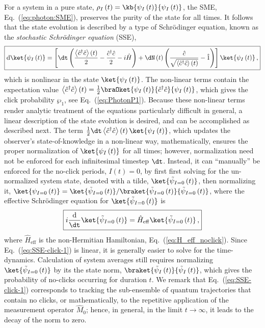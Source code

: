 For a system in a pure state, $\rho_{I}\left(t\right)=\kb{\psi_{I}\left(t\right)}{\psi_{I}\left(t\right)}$,
the SME, Eq.~(\ref{eq:photon:SME}), preserves the purity of the
state for all times. It follows that the state evolution is described
by a type of Schrödinger equation, known as the \emph{stochastic Schrödinger
equation }(SSE), 
\begin{equation}
\boxed{\mathrm{d}\ket{\psi_{I}\left(t\right)}=\left[\dt\left(\frac{\left\langle \hat{c}^{\dagger}\hat{c}\right\rangle \left(t\right)}{2}-\frac{\hat{c}^{\dagger}\hat{c}}{2}-i\hat{H}\right)+\dN\left(t\right)\left(\frac{\hat{c}}{\sqrt{\left\langle \hat{c}^{\dagger}\hat{c}\right\rangle \left(t\right)}}-\hat{1}\right)\right]\ket{\psi_{I}\left(t\right)}\,,}\label{eq:SSE-click}
\end{equation}
which is nonlinear in the state $\ket{\psi_{I}\left(t\right)}$. The
non-linear terms contain the expectation value $\left\langle \hat{c}^{\dagger}\hat{c}\right\rangle \left(t\right)=\frac{1}{2}\braOket{\psi_{I}\left(t\right)}{\hat{c}^{\dagger}\hat{c}}{\psi_{I}\left(t\right)}$,
which gives the click probability $\wp_{1}$, see Eq.~(\ref{eq:PhotonP1}).
Because these non-linear terms render analytic treatment of the equations
particularly difficult in general, a linear description of the state
evolution is desired, and can be accomplished as described next. The
term $\frac{1}{2}\dt\left\langle \hat{c}^{\dagger}\hat{c}\right\rangle \left(t\right)\ket{\psi_{I}\left(t\right)}$,
which updates the observer's state-of-knowledge in a non-linear way,
mathematically, ensures the proper normalization of $\ket{\psi_{I}\left(t\right)}$
for all times; however, normalization need not be enforced for each
infinitesimal timestep $\dt$. Instead, it can ``manually'' be enforced
for the no-click periods, $I\left(t\right)=0$, by first first solving
for the un-normalized system state, denoted with a tilde, $\ket{\tilde{\psi}_{I=0}\left(t\right)}$,
then normalizing it, $\ket{\psi_{I=0}\left(t\right)}=\ket{\tilde{\psi}_{I=0}\left(t\right)}/\braket{\tilde{\psi}_{I=0}\left(t\right)}{\tilde{\psi}_{I=0}\left(t\right)}$,
where the effective Schrödinger equation for $\ket{\tilde{\psi}_{I=0}\left(t\right)}$
is
\begin{equation}
\boxed{i\frac{\mathrm{d}}{\dt}\ket{\tilde{\psi}_{I=0}\left(t\right)}=\hat{H}_{\mathrm{eff}}\ket{\tilde{\psi}_{I=0}\left(t\right)}\,,}\label{eq:SSE-click-1}
\end{equation}
where $\hat{H}_{\mathrm{eff}}$ is the non-Hermitian Hamiltonian,
Eq.~(\ref{eq:H_eff_noclick}). Since Eq.~(\ref{eq:SSE-click-1})
is linear, it is generally easier to solve for the time-dynamics.
Calculation of system averages still requires normalizing $\ket{\tilde{\psi}_{I=0}\left(t\right)}$
by its the state norm, $\braket{\tilde{\psi}_{I}\left(t\right)}{\tilde{\psi}_{I}\left(t\right)}$,
which gives the probability of no-clicks occurring for duration $t$.
We remark that Eq.~(\ref{eq:SSE-click-1}) corresponds to tracking
the sub-ensemble of quantum trajectories that contain no clicks, or
mathematically, to the repetitive application of the measurement operator
$\hat{M}_{0}$; hence, in general, in the limit $t\rightarrow\infty$,
it leads to the decay of the norm to zero. 

